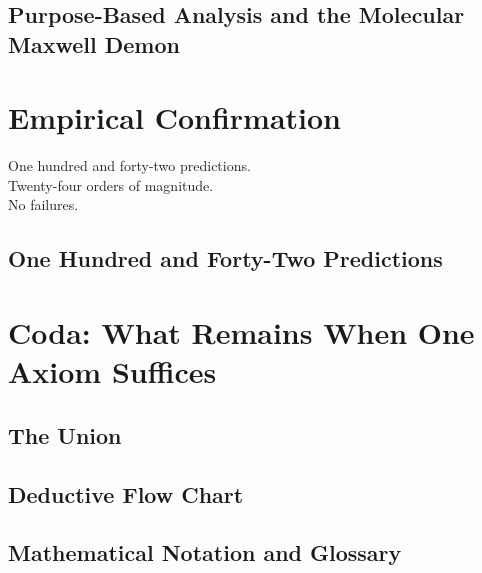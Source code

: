 \documentclass[12pt, twoside, openright]{book}
\theoremstyle{definition}
\theoremstyle{remark}
\begin{document}
\chapter{Purpose-Based Analysis and the Molecular Maxwell Demon}
\label{ch:purpose}


\part{Empirical Confirmation}
\label{part:empirical}

\epigraph{%
  One hundred and forty-two predictions.\\
  Twenty-four orders of magnitude.\\
  No failures.%
}{}

\chapter{One Hundred and Forty-Two Predictions}
\label{ch:predictions}



\part*{Coda: What Remains When One Axiom Suffices}

\chapter{The Union}
\label{ch:union}


\backmatter

\appendix

\chapter{Deductive Flow Chart}
\label{app:flowchart}


\chapter{Mathematical Notation and Glossary}
\label{app:notation}

\end{document}
